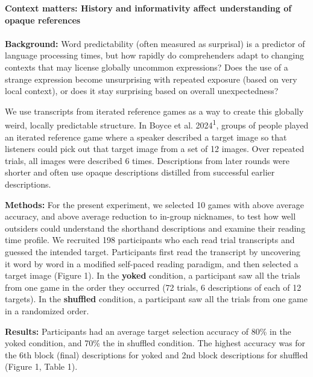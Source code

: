 \documentclass[11pt,a4paper]{article}
\renewcommand{\title}[1]{\textbf{#1}\\}
\newcommand{\authors}[1]{\iftoggle{anonymous}{\phantom{#1}}{#1}\\}
\begin{document}
\noindent\title{Context matters: History and informativity affect understanding of opaque references}
\authors{Veronica Boyce (vboyce@stanford.edu), Ben Prystawski, Alvin Tan, Michael C. Frank \\Stanford University}

\textbf{Background:} Word predictability (often measured as surprisal) is a predictor of language processing times, but how rapidly do comprehenders adapt to changing contexts that may license globally uncommon expressions? Does the use of a strange expression become unsurprising with repeated exposure (based on very local context), or does it stay surprising based on overall unexpectedness? 

We use transcripts from iterated reference games as a way to create this globally weird, locally predictable structure. In Boyce et al. 2024\textsuperscript{1}, groups of people played an iterated reference game where a speaker described a target image so that listeners could pick out that target image from a set of 12 images. Over repeated trials, all images were described 6 times. Descriptions from later rounds were shorter and often use opaque descriptions distilled from successful earlier descriptions.

\smallskip

\textbf{Methods:} For the present experiment, we selected 10 games with above average accuracy, and above average reduction to in-group nicknames, to test how well outsiders could understand the shorthand descriptions and examine their reading time profile. We recruited 198 participants who each read trial transcripts and guessed the intended target. Participants first read the transcript by uncovering it word by word in a modified self-paced reading paradigm, and then selected a target image (Figure 1). In the \textbf{yoked} condition, a participant saw all the trials from one game in the order they occurred (72 trials, 6 descriptions of each of 12 targets). In the \textbf{shuffled} condition, a participant saw all the trials from one game in a randomized order.

\smallskip

\textbf{Results:} Participants had an average target selection accuracy of 80\% in the yoked condition, and 70\% the in shuffled condition. The highest accuracy was for the 6th block (final) descriptions for yoked and 2nd block descriptions for shuffled (Figure 1, Table 1).
\end{document}
